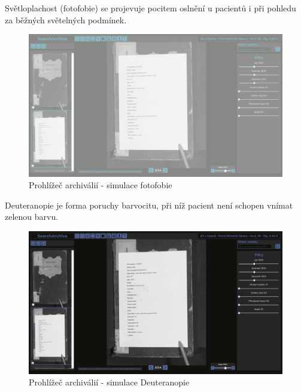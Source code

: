 \newpage
\noindent
Světloplachost (fotofobie) se projevuje pocitem oslnění u pacientů i při pohledu za běžných světelných podmínek.
\begin{figure}[htbp]
\centering
    \includegraphics[scale=.35]{obrazky-figures/testing/figma-eye-defects/Gallery Page - Bright Light.png}
    \caption{Prohlížeč archiválií - simulace fotofobie}
\end{figure}

\noindent
Deuteranopie je forma poruchy barvocitu, při níž pacient není schopen vnímat zelenou barvu.
\begin{figure}[htbp]
\centering
    \includegraphics[scale=.35]{obrazky-figures/testing/figma-eye-defects/Gallery Page - Deuteranopia.png}
    \caption{Prohlížeč archiválií - simulace Deuteranopie}
\end{figure}

